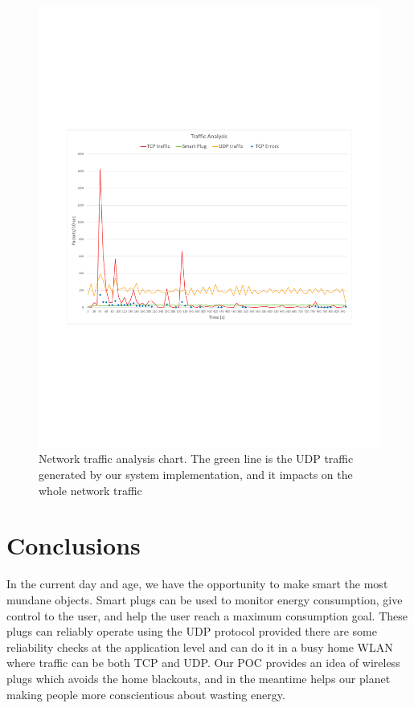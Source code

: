 \documentclass[conference]{IEEEtran}
\begin{document}
	\begin{figure}[htbp]
		\centering
		\includegraphics[width=\linewidth]{assets/grafico}
		\caption{Network traffic analysis chart. The green line is the UDP  traffic generated by our system implementation, and it impacts on the whole network traffic}
		\label{fig:grafico}
	\end{figure}
	
	\section{Conclusions}
	In the current day and age, we have the opportunity to make smart the most mundane objects. Smart plugs can be used to monitor energy consumption, give control to the user, and help the user reach a maximum consumption goal. These plugs can reliably operate using the UDP protocol provided there are some reliability checks at the application level and can do it in a busy home WLAN where traffic can be both TCP and UDP.
	Our POC provides an idea of wireless plugs which avoids the home blackouts, and in the meantime helps our planet making people more conscientious about wasting energy.
	{}
	
	
\end{document}
